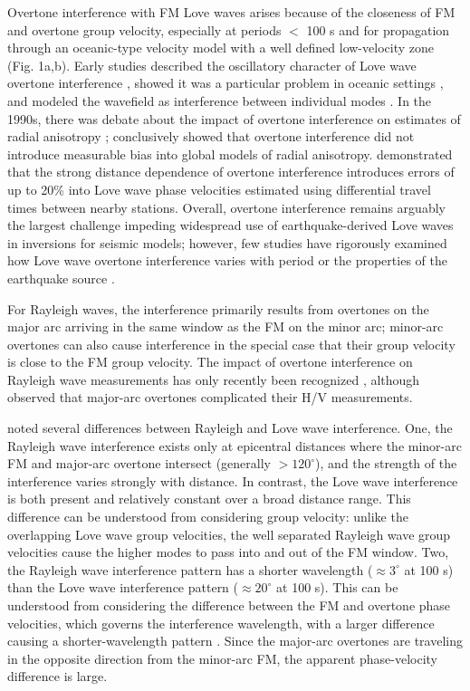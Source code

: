 \documentclass[extra,mreferee]{gji}
\begin{document}
Overtone interference with FM Love waves arises because of the closeness of FM and overtone group velocity, especially at periods $<$ 100 s and for propagation through an oceanic-type velocity model with a well defined low-velocity zone (Fig. 1a,b). Early studies described the oscillatory character of Love wave overtone interference \citep{thatcher1969higher,boore1969effect}, showed it was a particular problem in oceanic settings \citep{thatcher1969higher,yoshida19831}, and modeled the wavefield as interference between individual modes \citep{forsyth1975new}. In the 1990s, there was debate about the impact of overtone interference on estimates of radial anisotropy \citep{polet1997upper,maupin1992love}; \citet{nettles2011effect} conclusively showed that overtone interference did not introduce measurable bias into global models of radial anisotropy.  \citet{foster2014overtone}  demonstrated that the strong distance dependence of  overtone interference introduces errors of up to 20\% into Love wave phase velocities estimated using differential travel times between nearby stations. Overall, overtone interference remains arguably the largest challenge impeding widespread use of earthquake-derived Love waves in inversions for seismic models; however, few studies have rigorously examined how Love wave overtone interference varies with period or the properties of the earthquake source \citep[e.g.][]{yoshida19831}.

For Rayleigh waves, the interference primarily results from overtones on the major arc arriving in the same  window as the FM on the minor arc; minor-arc overtones can also cause interference in the special case that their group velocity is close to the FM group velocity. The impact of overtone interference on Rayleigh wave measurements  has only recently been recognized  \citep{hariharan2020evidence}, although \citet{tanimoto2008zh} observed that major-arc overtones complicated their H/V measurements.

\citet{hariharan2020evidence} noted several differences between Rayleigh and Love wave interference. One, the Rayleigh wave interference exists only at epicentral distances where the minor-arc FM and major-arc overtone intersect (generally $>120^\circ$), and the strength of the interference varies strongly with distance. In contrast, the Love wave interference is both present and relatively constant over a broad distance range. This difference can be understood from considering group velocity: unlike the overlapping Love wave group velocities, the well separated Rayleigh wave group velocities cause the higher modes to pass into and out of the FM window. Two, the Rayleigh wave interference pattern has a shorter wavelength ($\approx 3^\circ$ at 100 s) than the Love wave interference pattern ($\approx 20^\circ$ at 100 s). This can be understood from considering the difference between the FM and overtone phase velocities, which governs the interference wavelength, with a larger difference causing a shorter-wavelength pattern \citep{thatcher1969higher,foster2014overtone}. Since the major-arc overtones are traveling in the opposite direction from the minor-arc FM, the apparent phase-velocity difference is large. 
\end{document}
